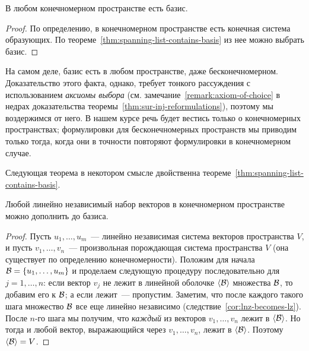 
\begin{corollary}\label{cor:a-basis-exists}
В любом конечномерном пространстве есть базис.
\end{corollary}
\begin{proof}
По определению, в конечномерном пространстве есть конечная система образующих.
По теореме~\ref{thm:spanning-list-contains-basis} из нее можно выбрать базис.
\end{proof}

\begin{remark}
На самом деле, базис есть в любом пространстве, даже бесконечномерном.
Доказательство этого факта, однако, требует тонкого рассуждения
с использованием {\em аксиомы выбора}
(см. замечание~\ref{remark:axiom-of-choice}
в недрах доказательства теоремы~\ref{thm:sur-inj-reformulations}),
поэтому мы воздержимся от него. В нашем курсе речь будет вестись только
о конечномерных пространствах; формулировки для бесконечномерных пространств
мы приводим только тогда, когда они в точности повторяют формулировки
в конечномерном случае.
\end{remark}

Следующая теорема в некотором смысле двойственна
теореме~\ref{thm:spanning-list-contains-basis}.
\begin{theorem}\label{thm:li-contained-in-a-basis}
Любой линейно независимый набор векторов в конечномерном пространстве
можно дополнить до базиса.
\end{theorem}
\begin{proof}
Пусть $u_1,\dots,u_m$~--- линейно независимая система векторов пространства $V$,
и пусть $v_1,\dots,v_n$~--- произвольная порождающая система пространства $V$
(она существует по определению конечномерности).
Положим для начала $\mathcal B = \{u_1,\dots,u_m\}$ и
проделаем следующую процедуру последовательно для $j=1,\dots,n$:
если вектор $v_j$ не лежит в линейной оболочке $\langle\mathcal B\rangle$ множества $\mathcal B$,
то добавим его к $\mathcal B$; а если лежит~--- пропустим. Заметим, что
после каждого такого шага множество $\mathcal B$ все еще линейно независимо
(следствие~\ref{cor:lnz-becomes-lz}). После $n$-го шага мы получим,
что {\em каждый} из векторов $v_1,\dots,v_n$ лежит в $\langle\mathcal B\rangle$.
Но тогда и любой вектор, выражающийся через $v_1,\dots,v_n$, лежит
в $\langle\mathcal B\rangle$. Поэтому $\langle\mathcal B\rangle = V$.
\end{proof}

